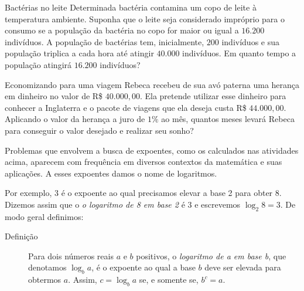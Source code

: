 \begin{task}{Bactérias no leite}
Determinada bactéria contamina um copo de leite à temperatura ambiente. Suponha que o leite seja considerado impróprio para o consumo se a população da bactéria no copo for maior ou igual a $16.200$ indivíduos. A população de bactérias tem, inicialmente, $200$ indivíduos e sua população triplica a cada hora até atingir $40.000$ indivíduos. Em quanto tempo a população atingirá $16.200$ indivíduos?
\end{task}



\begin{task}{Economizando para uma viagem}
Rebeca recebeu de sua avó paterna uma herança em dinheiro no valor de R\$ $40.000{,}00$. Ela pretende utilizar esse dinheiro para conhecer a Inglaterra e o pacote de viagens que ela deseja custa R\$ $44.000{,}00$. Aplicando o valor da herança a juro de $1\%$ ao mês, quantos meses levará Rebeca para conseguir o valor desejado e realizar seu sonho?
\end{task}

\label{organizando-as-ideias-logaritmos}

Problemas que envolvem a busca de expoentes, como os calculados nas atividades acima, aparecem com frequência em diversos contextos da matemática e suas aplicações. A esses expoentes damos o nome de logaritmos.


Por exemplo, 3 é o expoente ao qual precisamos elevar a base 2 para obter 8. Dizemos assim que o \textit{o logaritmo de 8 em base 2} é 3 e escrevemos $\log_2 8 = 3$. De modo geral definimos:


\begin{description}
\item[Definição]
Para dois números reais $a$ e $b$ positivos, o \textit{logaritmo de a em base b}, que denotamos $\log_b a$, é o expoente ao qual a base $b$ deve ser elevada para obtermos $a$. Assim, $c=\log_b a$ se, e somente se, $b^c=a$.
\end{description}

